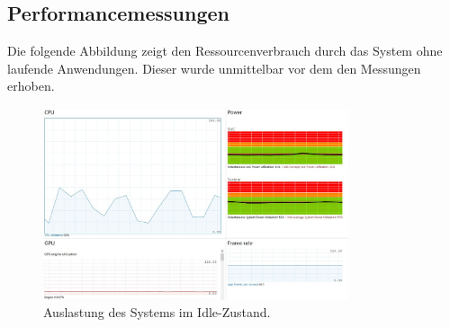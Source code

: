 \subsection{Performancemessungen}
Die folgende Abbildung zeigt den Ressourcenverbrauch durch das System ohne laufende Anwendungen. Dieser wurde unmittelbar vor dem den Messungen erhoben.
\begin{figure}[h!]
	\centering
	\includegraphics[width=0.8\textwidth]{images/performance/idle.jpg}
	\caption{Auslastung des Systems im Idle-Zustand.}
	\label{img:idle}
\end{figure}
